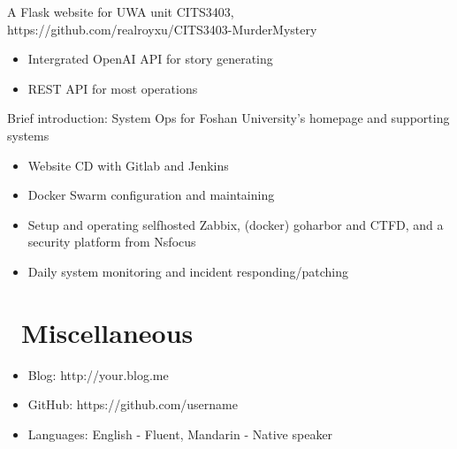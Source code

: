 \documentclass{resume}
\begin{document}
A Flask website for UWA unit CITS3403, https://github.com/realroyxu/CITS3403-MurderMystery
\begin{itemize}
  \item Intergrated OpenAI API for story generating
  \item REST API for most operations
\end{itemize}

Brief introduction: System Ops for Foshan University's homepage and supporting systems
\begin{itemize}
  \item Website CD with Gitlab and Jenkins
  \item Docker Swarm configuration and maintaining
  \item Setup and operating selfhosted Zabbix, (docker) goharbor and CTFD, and a security platform from Nsfocus
  \item Daily system monitoring and incident responding/patching
\end{itemize}




\section{\faInfo\ Miscellaneous}
\begin{itemize}[parsep=0.5ex]
  \item Blog: http://your.blog.me
  \item GitHub: https://github.com/username
  \item Languages: English - Fluent, Mandarin - Native speaker
\end{itemize}

%
%
\end{document}
